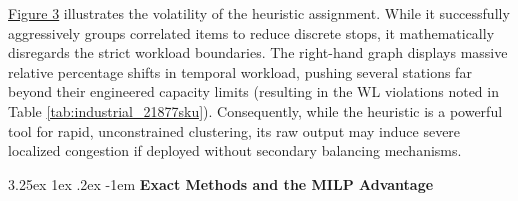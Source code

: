 \documentclass[preprint,review,11pt,authoryear]{elsarticle}
\makeatletter
\renewcommand\paragraph{\@startsection{paragraph}{4}{\z@}
  {3.25ex \@plus1ex \@minus.2ex}
  {-1em}
  {\normalfont\normalsize\itshape}}
\makeatother
\begin{document}
\hyperref[fig:comparison_lines_heuristic]{Figure 3} illustrates the volatility of the heuristic assignment. While it successfully aggressively groups correlated items to reduce discrete stops, it mathematically disregards the strict workload boundaries. The right-hand graph displays massive relative percentage shifts in temporal workload, pushing several stations far beyond their engineered capacity limits (resulting in the WL violations noted in Table \ref{tab:industrial_21877sku}). Consequently, while the heuristic is a powerful tool for rapid, unconstrained clustering, its raw output may induce severe localized congestion if deployed without secondary balancing mechanisms.

\paragraph{\textbf{Exact Methods and the MILP Advantage}}
\end{document}
